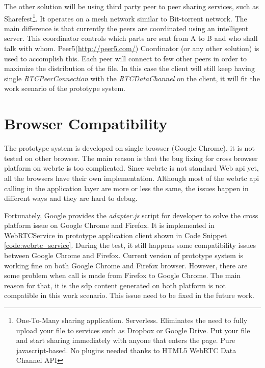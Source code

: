 \par The other solution will be using third party peer to peer sharing services, such as Sharefest\footnote{One-To-Many sharing application. Serverless. Eliminates the need to fully upload your file to services such as Dropbox or Google Drive. Put your file and start sharing immediately with anyone that enters the page. Pure javascript-based. No plugins needed thanks to HTML5 WebRTC Data Channel API}. It operates on a mesh network similar to Bit-torrent network. The main difference is that currently the peers are coordinated using an intelligent server. This coordinator controls which parts are sent from A to B and who shall talk with whom. Peer5(\url{http://peer5.com/}) Coordinator (or any other solution) is used to accomplish this. Each peer will connect to few other peers in order to maximize the distribution of the file.\cite{github:sharefest} In this case the client will still keep having single \textit{RTCPeerConnection} with the \textit{RTCDataChannel} on the client, it will fit the work scenario of the prototype system.

\section{Browser Compatibility}

\par The prototype system is developed on single browser (Google Chrome), it is not tested on other browser. The main reason is that the bug fixing for cross browser platform on \gls{webrtc} is too complicated. Since \gls{webrtc} is not standard Web \gls{api} yet, all the browsers have their own implementation. Although most of the \gls{webrtc} \gls{api} calling in the application layer are more or less the same, the issues happen in different ways and they are hard to debug.

\par Fortunately, Google provides the \textit{adapter.js} script for developer to solve the cross platform issue on Google Chrome and Firefox. It is implemented in WebRTCService in prototype application client shown in Code Snippet \ref{code:webrtc_service}. During the test, it still happens some compatibility issues between Google Chrome and Firefox. Current version of prototype system is working fine on both Google Chrome and Firefox browser. However, there are some problem when call is made from Firefox to Google Chrome. The main reason for that, it is the \gls{sdp} content generated on both platform is not compatible in this work scenario. This issue need to be fixed in the future work.


